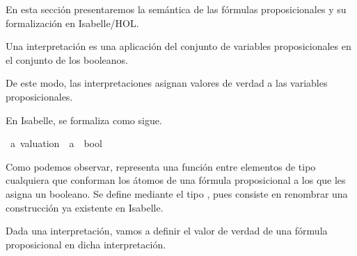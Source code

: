 %
\begin{isabellebody}%
%
%
\isadelimtheory
%
\endisadelimtheory
%
\isatagtheory
%
\endisatagtheory
{\isafoldtheory}%
%
\isadelimtheory
%
\endisadelimtheory
%
\isadelimdocument
%
\endisadelimdocument
%
\isatagdocument
%
\isamarkuptrue%
%
\endisatagdocument
{\isafolddocument}%
%
\isadelimdocument
%
\endisadelimdocument
%
\begin{isamarkuptext}%
En esta sección presentaremos la semántica de las fórmulas
  proposicionales y su formalización en Isabelle/HOL. 

  \begin{definicion}
  Una interpretación es una aplicación del conjunto de variables
  proposicionales en el conjunto \isa{{\isasymBB}} de los booleanos.
  \end{definicion}

  De este modo, las interpretaciones asignan valores de verdad a las 
  variables proposicionales.

  En Isabelle, se formaliza como sigue.%
\end{isamarkuptext}\isamarkuptrue%
\isamarkupfalse%
\ {\isacharprime}a\ valuation\ {\isacharequal}\ {\isachardoublequoteopen}{\isacharprime}a\ {\isasymRightarrow}\ bool{\isachardoublequoteclose}%
\begin{isamarkuptext}%
Como podemos observar,  representa
  una función entre elementos de tipo  cualquiera que conforman los
  átomos de una fórmula proposicional a los que les asigna un booleano. 
  Se define mediante el tipo , pues consiste en renombrar 
  una construcción ya existente en Isabelle.

  Dada una interpretación, vamos a definir el valor de verdad de una 
  fórmula proposicional en dicha interpretación.


\end{isamarkuptext}
\end{isabellebody}
